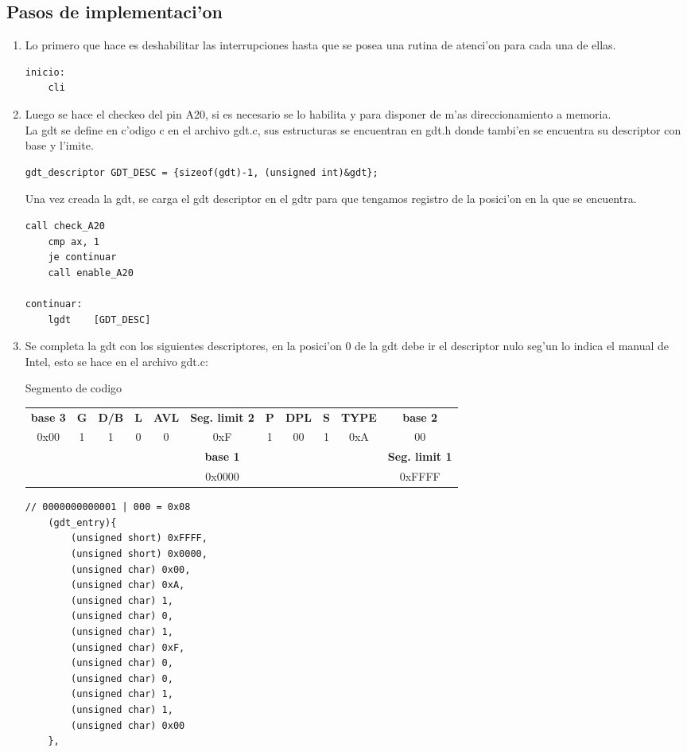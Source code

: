\documentclass[11pt]{article}
\begin{document}
\subsection{Pasos de implementaci'on}
\begin{enumerate}
\item Lo primero que hace es deshabilitar las interrupciones hasta que se posea una rutina de atenci'on para cada una de ellas.
\begin{lstlisting}[frame=single]
inicio:
	cli
\end{lstlisting}
\item 
Luego se hace el checkeo del pin A20, si es necesario se lo habilita y para disponer de m'as direccionamiento a memoria. \\ La gdt se define en c'odigo c en el archivo gdt.c, sus estructuras se encuentran en gdt.h donde tambi'en se encuentra su descriptor con base y l'imite.
\begin{lstlisting}[frame=single]
gdt_descriptor GDT_DESC = {sizeof(gdt)-1, (unsigned int)&gdt};
\end{lstlisting}
Una vez creada la gdt, se carga el gdt descriptor en el gdtr para que tengamos registro de la posici'on en la que se encuentra.
\begin{lstlisting}[frame=single]
	call check_A20	
 	cmp ax, 1
 	je continuar
	call enable_A20	

continuar:
	lgdt	[GDT_DESC]
\end{lstlisting}

\item Se completa la gdt con los siguientes descriptores, en la posici'on 0 de la gdt debe ir el descriptor nulo seg'un lo indica el manual de Intel, esto se hace en el archivo gdt.c:

\begin{center} Segmento de codigo
\begin{tabular}[t]{|c c c c c c|c c c c c|}
\hline
\textbf{base 3} & \textbf{G} & \textbf{D/B} & \textbf{L} & \textbf{AVL} & \textbf{Seg. limit 2} & \textbf{P} & \textbf{DPL} & \textbf{S} & \textbf{TYPE} & \textbf{base 2} \\
0x00 & 1 & 1 & 0 & 0 & 0xF & 1 & 00 & 1 & 0xA & 00 \\
\hline
& & & & & \textbf{base 1} & & & & & \textbf{Seg. limit 1} \\
& & & & & 0x0000 & & & & & 0xFFFF  \\
\hline
\end{tabular}
\end{center}
\begin{lstlisting}[frame=single]
// 0000000000001 | 000 = 0x08
	(gdt_entry){ 
		(unsigned short) 0xFFFF, 
		(unsigned short) 0x0000,
		(unsigned char) 0x00, 
		(unsigned char) 0xA, 
		(unsigned char) 1, 
		(unsigned char) 0, 
		(unsigned char) 1, 
		(unsigned char) 0xF,
		(unsigned char) 0,  
		(unsigned char) 0,  
		(unsigned char) 1,  
		(unsigned char) 1, 
		(unsigned char) 0x00 
	},
\end{lstlisting}


\end{enumerate}
\end{document}
